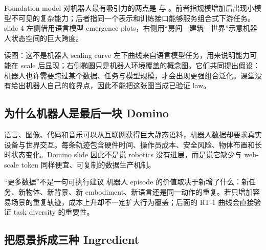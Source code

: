 Foundation model 对机器人最有吸引力的两点是  与 。前者指规模增加后出现小模型不可见的复杂能力；后者指同一个表示和训练接口能够服务组合式下游任务。slide 4 左侧借用语言模型 emergence plots，右侧用“房间—建筑—世界”示意机器人状态空间的巨大跨度。


\begin{knowledgebox}{读图：这不是机器人 scaling curve}
左下曲线来自语言模型任务，用来说明能力可能在 scale 后显现；右侧椭圆只是机器人环境覆盖的概念图。它们共同提出假设：机器人也许需要跨过某个数据、任务与模型规模，才会出现更强组合泛化。课堂没有给出机器人自己的临界点，因此不能把这张图当成已验证 law。
\end{knowledgebox}


\subsection{为什么机器人是最后一块 Domino}

语言、图像、代码和音乐可以从互联网获得巨大静态语料，机器人数据却要求真实设备与世界交互。每条轨迹包含硬件时间、操作员成本、安全风险、物体布置和长时状态变化。Domino slide 因此不是说 robotics 没有进展，而是说它缺少与 web-scale token 同样便宜、可复制的数据生产机制。


\begin{warningbox}{“更多数据”不是一句可执行建议}
机器人 episode 的价值取决于新增了什么：新任务、新物体、新背景、新 embodiment、新语言还是同一动作的重复。若只增加容易场景的重复轨迹，成本上升却不一定扩大行为覆盖；后面的 RT-1 曲线会直接验证 task diversity 的重要性。
\end{warningbox}

\subsection{把愿景拆成三种 Ingredient}

